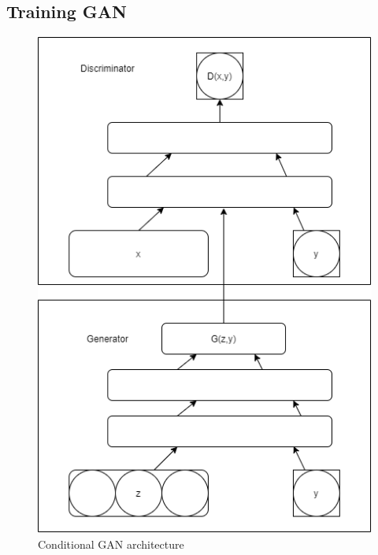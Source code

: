 \documentclass[conference]{IEEEtran}
\begin{document}
\subsection{Training GAN}
\begin{figure}[htbp]
\centerline{\includegraphics[scale=0.5]{cGAN architecture.png}}
\caption{Conditional GAN architecture}
\label{fig}
\end{figure}
\end{document}
